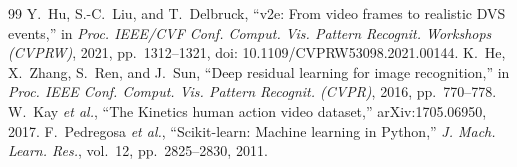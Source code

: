 \documentclass[conference]{IEEEtran}
\begin{document}
\begin{thebibliography}{99}
 Y.~Hu, S.-C.~Liu, and T.~Delbruck, ``v2e: From video frames to realistic DVS events,'' in \emph{Proc. IEEE/CVF Conf. Comput. Vis. Pattern Recognit. Workshops (CVPRW)}, 2021, pp.~1312--1321, doi: 10.1109/CVPRW53098.2021.00144.
 K.~He, X.~Zhang, S.~Ren, and J.~Sun, ``Deep residual learning for image recognition,'' in \emph{Proc. IEEE Conf. Comput. Vis. Pattern Recognit. (CVPR)}, 2016, pp.~770--778.
 W.~Kay \emph{et al.}, ``The Kinetics human action video dataset,'' arXiv:1705.06950, 2017.
 F.~Pedregosa \emph{et al.}, ``Scikit-learn: Machine learning in Python,'' \emph{J. Mach. Learn. Res.}, vol.~12, pp.~2825--2830, 2011.
\end{thebibliography}
\end{document}
